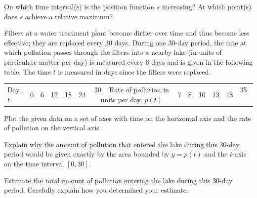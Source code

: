 \begin{exercises}
	\item On which time interval(s) is the position function $s$ increasing?  At which point(s) does $s$ achieve a relative maximum?
 \ea
  \item Filters at a water treatment plant become dirtier over time and thus become less effective; they are replaced every 30 days.  During one 30-day period, the rate at which pollution passes through the filters into a nearby lake (in units of particulate matter per day) is measured every 6 days and is given in the following table.  The time $t$  is measured in days since the filters were replaced.
\begin{center}
\begin{tabular}{|l|c|c|c|c|c|c|}
\hline
Day, $t$ & 0 & 6 & 12 &	18 & 24 & 30 \
\hline
Rate of pollution in units per day, $p(t)$ & 7 & 8 & 10 &	13 & 18 & 35 \
\hline
\end{tabular}
\end{center}
\ba
	\item Plot the given data on a set of axes with time on the horizontal axis and the rate of pollution on the vertical axis.
	\item Explain why the amount of pollution that entered the lake during this 30-day period would be given exactly by the area bounded by $y = p(t)$ and the $t$-axis on the time interval $[0,30]$.
	\item Estimate the total amount of pollution entering the lake during this 30-day period.  Carefully explain how you determined your estimate.
\ea
\end{exercises}
\afterexercises

\clearpage

